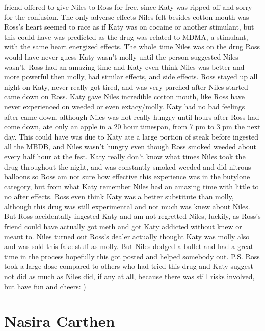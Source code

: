 \documentclass[12pt]{book}
\begin{document}
friend offered to give Niles to Ross for free, since Katy was ripped off and sorry for the confusion. The only adverse effects Niles felt besides cotton mouth was Ross's heart seemed to race as if Katy was on cocaine or another stimulant, but this could have was predicted as the drug was related to MDMA, a stimulant, with the same heart energized effects. The whole time Niles was on the drug Ross would have never guess Katy wasn't molly until the person suggested Niles wasn't. Ross had an amazing time and Katy even think Niles was better and more powerful then molly, had similar effects, and side effects. Ross stayed up all night on Katy, never really got tired, and was very parched after Niles started came down on Ross. Katy gave Niles incredible cotton mouth, like Ross have never experienced on weeded or even extacy/molly. Katy had no bad feelings after came down, although Niles was not really hungry until hours after Ross had come down, ate only an apple in a 20 hour timespan, from 7 pm to 3 pm the next day. This could have was due to Katy ate a large portion of steak before ingested all the MBDB, and Niles wasn't hungry even though Ross smoked weeded about every half hour at the fest. Katy really don't know what times Niles took the drug throughout the night, and was constantly smoked weeded and did nitrous balloons so Ross am not sure how effective this experience was in the butylone category, but from what Katy remember Niles had an amazing time with little to no after effects. Ross even think Katy was a better substitute than molly, although this drug was still experimental and not much was knew about Niles. But Ross accidentally ingested Katy and am not regretted Niles, luckily, as Ross's friend could have actually got meth and got Katy addicted without knew or meant to. Niles turned out Ross's dealer actually thought Katy was molly also and was sold this fake stuff as molly. But Niles dodged a bullet and had a great time in the process hopefully this got posted and helped somebody out. P.S. Ross took a large dose compared to others who had tried this drug and Katy suggest not did as much as Niles did, if any at all, because there was still risks involved, but have fun and cheers: )



\chapter{Nasira Carthen}
\end{document}
